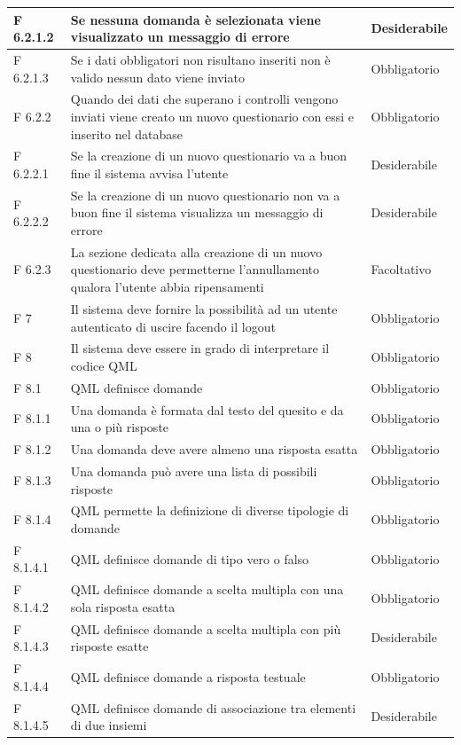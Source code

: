 \documentclass[a4paper,11pt]{article}
\begin{document}
\begin{longtable}{p{}p{}p{}}
\midrule
F 6.2.1.2 & Se nessuna domanda è selezionata viene visualizzato un messaggio di errore & Desiderabile\\
\midrule
F 6.2.1.3 & Se i dati obbligatori non risultano inseriti non è valido nessun dato viene inviato & Obbligatorio\\
\midrule
F 6.2.2 & Quando dei dati che superano i controlli vengono inviati viene creato un nuovo questionario con essi e inserito nel database & Obbligatorio\\
\midrule
F 6.2.2.1 & Se la creazione di un nuovo questionario va a buon fine il sistema avvisa l'utente & Desiderabile\\
\midrule
F 6.2.2.2 & Se la creazione di un nuovo questionario non va a buon fine il sistema visualizza un messaggio di errore & Desiderabile\\
\midrule
F 6.2.3 & La sezione dedicata alla creazione di un nuovo questionario deve permetterne l'annullamento qualora l'utente abbia ripensamenti & Facoltativo\\
\midrule
F 7 & Il sistema deve fornire la possibilità ad un utente autenticato di uscire facendo il logout & Obbligatorio\\
\midrule
F 8 & Il sistema deve essere in grado di interpretare il codice QML & Obbligatorio\\
\midrule
F 8.1 & QML definisce domande & Obbligatorio\\
\midrule
F 8.1.1 & Una domanda è formata dal testo del quesito e da una o più risposte & Obbligatorio\\
\midrule
F 8.1.2 & Una domanda deve avere almeno una risposta esatta & Obbligatorio\\
\midrule
F 8.1.3 & Una domanda può avere una lista di possibili risposte & Obbligatorio\\
\midrule
F 8.1.4 & QML permette la definizione di diverse tipologie di domande & Obbligatorio\\
\midrule
F 8.1.4.1 & QML definisce domande di tipo vero o falso & Obbligatorio\\
\midrule
F 8.1.4.2 & QML definisce domande a scelta multipla con una sola risposta esatta & Obbligatorio\\
\midrule
F 8.1.4.3 & QML definisce domande a scelta multipla con più risposte esatte & Desiderabile\\
\midrule
F 8.1.4.4 & QML definisce domande a risposta testuale & Obbligatorio\\
\midrule
F 8.1.4.5 & QML definisce domande di associazione tra elementi di due insiemi & Desiderabile\\

\end{longtable}
\end{document}
